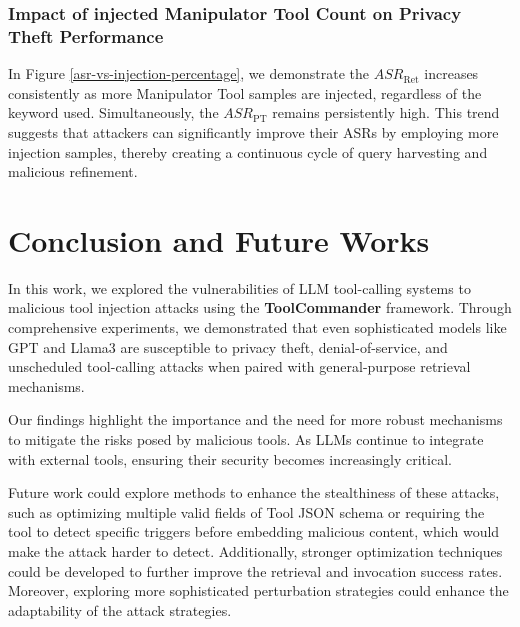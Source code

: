 \subsubsection{Impact of injected Manipulator Tool Count on Privacy Theft Performance}
In Figure \ref{asr-vs-injection-percentage}, 
we demonstrate the $ASR_{\text{Ret}}$ increases consistently as more Manipulator Tool samples are injected, regardless of the keyword used. Simultaneously, the $ASR_{\text{PT}}$ remains persistently high. This trend suggests that attackers can significantly improve their ASRs by employing more injection samples, thereby creating a continuous cycle of query harvesting and malicious refinement.

\section{Conclusion and Future Works}

In this work, we explored the vulnerabilities of LLM tool-calling systems to malicious tool injection attacks using the  \textbf{ToolCommander} framework. Through comprehensive experiments, we demonstrated that even sophisticated models like GPT and Llama3 are susceptible to privacy theft, denial-of-service, and unscheduled tool-calling attacks when paired with general-purpose retrieval mechanisms.

Our findings highlight the importance and the need for more robust mechanisms to mitigate the risks posed by malicious tools. As LLMs continue to integrate with external tools, ensuring their security becomes increasingly critical.

Future work could explore methods to enhance the stealthiness of these attacks, such as optimizing multiple valid fields of Tool JSON schema or requiring the tool to detect specific triggers before embedding malicious content, which would make the attack harder to detect. Additionally, stronger optimization techniques could be developed to further improve the retrieval and invocation success rates. Moreover, exploring more sophisticated perturbation strategies could enhance the adaptability of the attack strategies.
